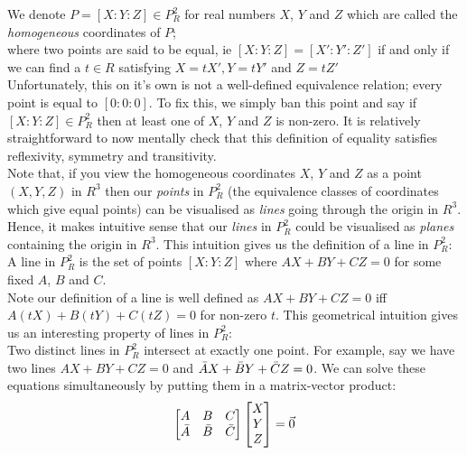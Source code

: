 \documentclass{article}
\begin{document}
We denote $P = [X : Y : Z] \in P_R^2$ for real numbers $X$, $Y$ and $Z$ which are called the \emph{homogeneous} coordinates of $P$;\\

where two points are said to be equal, ie $[X : Y : Z] = [X' : Y' : Z']$ if and only if we can find a $t \in R$ satisfying $X = tX', Y =  tY'$ and $Z = tZ'$\\

Unfortunately, this on it's own is not a well-defined equivalence relation; every point is equal to $[0 : 0 : 0]$. To fix this, we simply ban this point and say if  $[X : Y : Z] \in P_R^2$  then at least one of $X$, $Y$ and $Z$ is non-zero. It is relatively straightforward to now mentally check that this definition of equality satisfies reflexivity, symmetry and transitivity.\\

Note that, if you view the homogeneous coordinates $X$, $Y$ and $Z$ as a point $(X, Y, Z)$ in $R^3$ then our \emph{points} in $P_R^2$ (the equivalence classes of coordinates which give equal points) can be visualised as \emph{lines} going through the origin in $R^3$. Hence, it makes intuitive sense that our \emph{lines} in $P_R^2$ could be visualised as \emph{planes} containing the origin in $R^3$. This intuition gives us the definition of a line in $P_R^2$:\\

A line in $P_R^2$ is the set of points $[X : Y : Z]$ where $AX + BY + CZ = 0$ for some fixed $A$, $B$ and $C$. \\

Note our definition of a line is well defined as  $AX + BY + CZ = 0$ iff  $A(tX) + B(tY) + C(tZ) = 0$ for non-zero $t$. This geometrical intuition gives us an interesting property of lines in $P_R^2$: \\

Two distinct lines in $P_R^2$ intersect at exactly one point. For example, say we have two lines $AX + BY + CZ = 0$ and $\Bar{A}X + \bar{B}Y + \bar{C}Z = 0$. We can solve these equations simultaneously by putting them in a matrix-vector product:\\

$$ \begin{bmatrix}
A & B & C \\
\Bar{A} & \Bar{B} & \Bar{C} 
\end{bmatrix} 
\begin{bmatrix}
X \\
Y \\
Z \\
\end{bmatrix} 
= \vec{0}
$$
\end{document}

